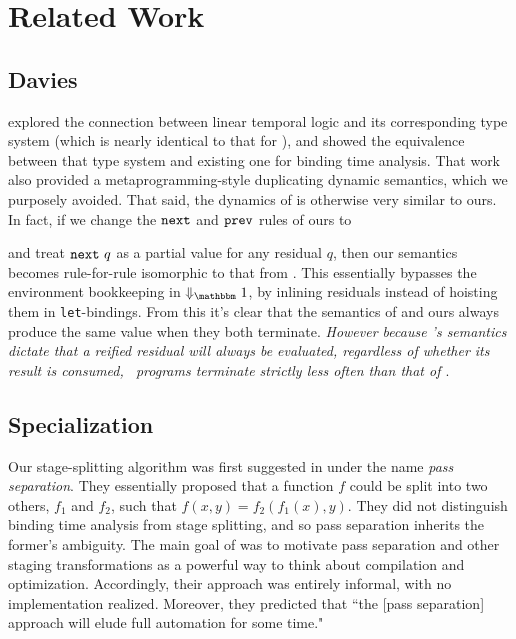 


\section{Related Work}

\subsection{Davies}

\cite{davies96} explored the connection between linear temporal logic and its corresponding type system (which is nearly identical to that for \lang), 
and showed the equivalence between that type system and existing one for binding time analysis. 
That work also provided a metaprogramming-style duplicating dynamic semantics, which we purposely avoided.
That said, the dynamics of \cite{davies96} is otherwise very similar to ours.
In fact, if we change the ${\tt next}$ and ${\tt prev}$ rules of ours to 
and treat ${\tt next}~q$ as a partial value for any residual $q$,
then our semantics becomes rule-for-rule isomorphic to that from \cite{davies96}. This essentially bypasses the
environment bookkeeping in $\redonesym$, by inlining residuals instead of
hoisting them in \verb|let|-bindings.
From this it's clear that the semantics of \cite{davies96} and ours always produce the same value when they both terminate.
{\em However because \lang's semantics dictate that a reified residual will always be evaluated, regardless of whether its result is consumed, \lang\ programs terminate strictly less often than that of \cite{davies96}}.

\subsection{Specialization}

Our stage-splitting algorithm was first suggested in \cite{jorring86} under the name {\em pass separation}.  They essentially proposed that a function $f$ could be split into two others, $f_1$ and $f_2$, such that $f(x,y)=f_2(f_1(x),y)$.  They did not distinguish binding time analysis from stage splitting, and so pass separation inherits the former's ambiguity.  The main goal of \cite{jorring86} was to motivate pass separation and other staging transformations as a powerful way to think about compilation and optimization.  Accordingly, their approach was entirely informal, with no implementation realized.  Moreover, they predicted that ``the [pass separation] approach will elude full automation for some time."  

